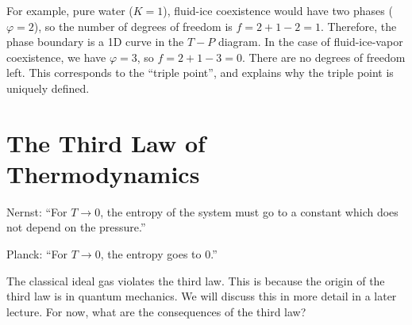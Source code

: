 \documentclass[a4paper,twoside,master.tex]{subfiles}
\begin{document}
For example, pure water ($ K = 1 $), fluid-ice coexistence would have two phases ($ \varphi = 2 $), so the number of degrees of freedom is $ f = 2 + 1 - 2 = 1 $. Therefore, the phase boundary is a 1D curve in the $ T-P $ diagram. In the case of fluid-ice-vapor coexistence, we have $ \varphi = 3 $, so $ f = 2 + 1 - 3 = 0 $. There are no degrees of freedom left. This corresponds to the ``triple point'', and explains why the triple point is uniquely defined.


\section{The Third Law of Thermodynamics}
\label{sec:the_third_law_of_thermodynamics}

Nernst: ``For $ T \to 0 $, the entropy of the system must go to a constant which does not depend on the pressure.''

Planck: ``For $ T \to 0 $, the entropy goes to $ 0 $.''

The classical ideal gas violates the third law. This is because the origin of the third law is in quantum mechanics. We will discuss this in more detail in a later lecture. For now, what are the consequences of the third law?
\end{document}
